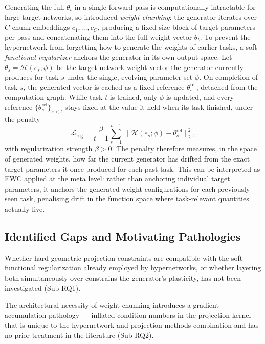 Generating the full $\theta_t$ in a single forward pass is computationally
intractable for large target networks, so \citet{oswald_continual_2020}
introduced \emph{weight chunking}: the generator iterates over $C$ chunk
embeddings $c_1,\dots,c_C$, producing a fixed-size block of target parameters
per pass and concatenating them into the full weight vector $\theta_t$.
To prevent the hypernetwork from forgetting how to generate the weights of
earlier tasks, a soft \emph{functional regularizer} anchors the generator in
its own output space.
Let $\theta_s = \mathcal{H}(e_s;\phi)$ be the target-network weight vector the
generator currently produces for task $s$ under the single, evolving parameter
set $\phi$.
On completion of task $s$, the generated vector is cached as a fixed reference
$\theta^{\mathrm{ref}}_s$, detached from the computation graph.
While task $t$ is trained, only $\phi$ is updated, and every reference
$\{\theta^{\mathrm{ref}}_s\}_{s<t}$ stays fixed at the value it held when its
task finished, under the penalty
\begin{equation}
    \mathcal{L}_{\mathrm{reg}}
    = \frac{\beta}{t-1} \sum_{s=1}^{t-1}
      \bigl\| \mathcal{H}(e_s;\phi) - \theta^{\mathrm{ref}}_s \bigr\|_2^2,
\end{equation}
with regularization strength $\beta > 0$.
The penalty therefore measures, in the space of generated weights, how far the
current generator has drifted from the exact target parameters it once produced
for each past task.
This can be interpreted as EWC applied at the meta level: rather than anchoring individual target
parameters, it anchors the generated weight configurations for each previously
seen task, penalising drift in the function space where task-relevant
quantities actually live.
\subsection{Identified Gaps and Motivating Pathologies}

Whether hard geometric projection constraints are compatible with the
soft functional regularization already employed by hypernetworks, or
whether layering both simultaneously over-constrains the generator's
plasticity, has not been investigated (Sub-RQ1).

The architectural necessity of weight-chunking introduces a
gradient accumulation pathology --- inflated condition numbers in
the projection kernel --- that is unique to the hypernetwork and projection methods combination
and has no prior treatment in the literature (Sub-RQ2).

